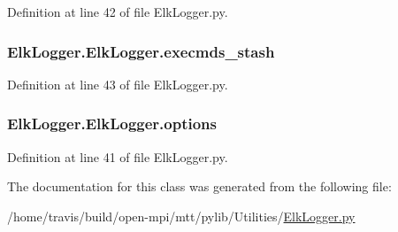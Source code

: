 Definition at line 42 of file Elk\-Logger.\-py.

\hypertarget{class_elk_logger_1_1_elk_logger_a65f00c7ccade5b7318512ef6e1a46812}{
\subsubsection[{execmds\-\_\-stash}]{\setlength{\rightskip}{0pt plus 5cm}Elk\-Logger.\-Elk\-Logger.\-execmds\-\_\-stash}}\label{class_elk_logger_1_1_elk_logger_a65f00c7ccade5b7318512ef6e1a46812}


Definition at line 43 of file Elk\-Logger.\-py.

\hypertarget{class_elk_logger_1_1_elk_logger_afb3317fb9852e155eafb35a70c3dc7e8}{
\subsubsection[{options}]{\setlength{\rightskip}{0pt plus 5cm}Elk\-Logger.\-Elk\-Logger.\-options}}\label{class_elk_logger_1_1_elk_logger_afb3317fb9852e155eafb35a70c3dc7e8}


Definition at line 41 of file Elk\-Logger.\-py.



The documentation for this class was generated from the following file\-:\begin{DoxyCompactItemize}
\item 
/home/travis/build/open-\/mpi/mtt/pylib/\-Utilities/\hyperlink{_elk_logger_8py}{Elk\-Logger.\-py}\end{DoxyCompactItemize}
